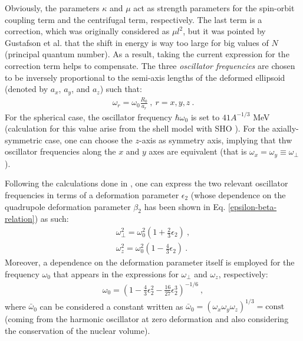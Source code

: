 Obviously, the parameters $\kappa$ and $\mu$ act as strength parameters for the spin-orbit coupling term and the centrifugal term, respectively. The last term is a correction, which was originally considered as $\mu l^2$, but it was pointed by Gustafson et al. \cite{gustafson1967nuclear} that the shift in energy is way too large for big values of $N$ (principal quantum number). As a result, taking the current expression for the correction term helps to compensate. The three \emph{oscillator frequencies} are chosen to be inversely proportional to the semi-axis lengths of the deformed ellipsoid (denoted by $a_x$, $a_y$, and $a_z$) such that:
\begin{align}
    \omega_r=\omega_0\frac{R_0}{a_r}\ ,\ r=x,y,z\ .
\end{align}
For the spherical case, the oscillator frequency $\hbar\omega_0$ is set to $41A^{-1/3}$ MeV (calculation for this value arise from the shell model with SHO \cite{bertulani2007nuclear}). For the axially-symmetric case, one can choose the $z$-axis as symmetry axis, implying that thw oscillator frequencies along the $x$ and $y$ axes are equivalent (that is $\omega_x=\omega_y\equiv\omega_\perp$).

Following the calculations done in \cite{bertulani2007nuclear}, one can express the two relevant oscillator frequencies in terms of a deformation parameter $\epsilon_2$ (whose dependence on the quadrupole deformation parameter $\beta_2$ has been shown in Eq. \ref{epsilon-beta-relation}) as such:
\begin{align}
    \omega_\perp^2=\omega_0^2\left(1+\frac{2}{3}\epsilon_2\right)\ ,\\
    \omega_z^2=\omega_0^2\left(1-\frac{4}{3}\epsilon_2\right)\ .
    \label{oscillator-frequencies-nilsson}
\end{align}
Moreover, a dependence on the deformation parameter itself is employed for the frequency $\omega_0$ that appears in the expressions for $\omega_\perp$ and $\omega_z$, respectively:
\begin{align}
    \omega_0=\left(1-\frac{4}{3}\epsilon_2^2-\frac{16}{27}\epsilon_2^3\right)^{-1/6}\ ,
    \label{omega-0-oscillator-frequency}
\end{align}
where $\bar{\omega}_0$ can be considered a constant written as $\bar{\omega}_0=(\omega_x\omega_y\omega_z)^{1/3}=\text{const}$ (coming from the harmonic oscillator at zero deformation and also considering the conservation of the nuclear volume).

